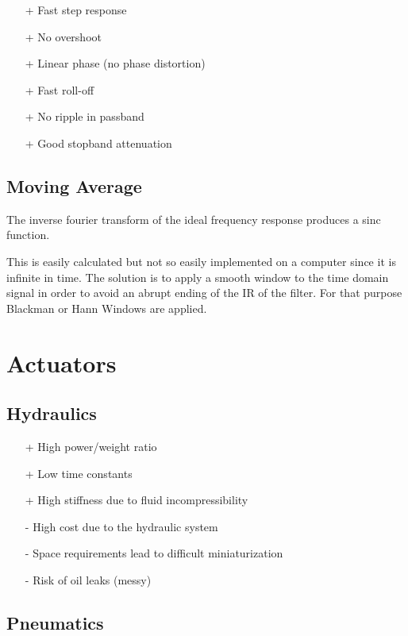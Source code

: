 \documentclass[10pt,a4paper]{scrartcl}
\begin{document}
\begin{multicols*}{2}
\begin{itemize}
\item[+] Fast step response
\item[+] No overshoot
\item[+] Linear phase (no phase distortion)
\item[+] Fast roll-off
\item[+] No ripple in passband
\item[+] Good stopband attenuation
\end{itemize}

\subsection{Moving Average}


The inverse fourier transform of the ideal frequency response produces a sinc function.


This is easily calculated but not so easily implemented on a computer since it is infinite in time. The solution is to apply a smooth window to the time domain signal in order to avoid an abrupt ending of the IR of the filter. For that purpose Blackman or Hann Windows are applied.

\section{Actuators}

\subsection{Hydraulics}

\begin{itemize}
\item[+] High power/weight ratio
\item[+] Low time constants
\item[+] High stiffness due to fluid incompressibility
\item[-] High cost due to the hydraulic system
\item[-] Space requirements lead to difficult miniaturization
\item[-] Risk of oil leaks (messy)
\end{itemize}

\subsection{Pneumatics}


\end{multicols*}
\end{document}
